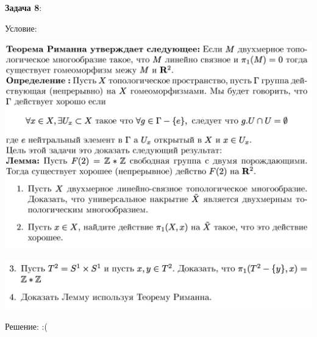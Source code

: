 \documentclass[12pt]{article}
\begin{document}
\begin{large}
\par \textbf{Задача 8}:
\par Условие:
\par
\includegraphics[width=1\textwidth]{photo_81.png}
\par
\includegraphics[width=1\textwidth]{photo_82.png}
\par Решение: :(
\par
\par
\end{large}
\end{document}
